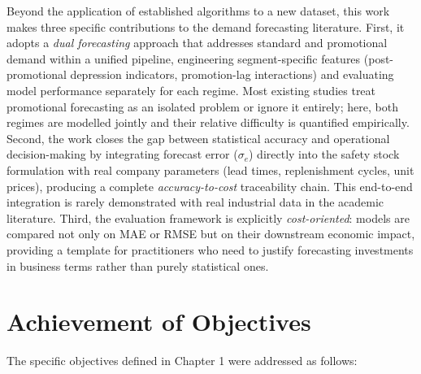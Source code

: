 Beyond the application of established algorithms to a new dataset, this work makes three specific contributions to the demand forecasting literature. First, it adopts a \textit{dual forecasting} approach that addresses standard and promotional demand within a unified pipeline, engineering segment-specific features (post-promotional depression indicators, promotion-lag interactions) and evaluating model performance separately for each regime. Most existing studies treat promotional forecasting as an isolated problem or ignore it entirely; here, both regimes are modelled jointly and their relative difficulty is quantified empirically. Second, the work closes the gap between statistical accuracy and operational decision-making by integrating forecast error ($\sigma_e$) directly into the safety stock formulation with real company parameters (lead times, replenishment cycles, unit prices), producing a complete \textit{accuracy-to-cost} traceability chain. This end-to-end integration is rarely demonstrated with real industrial data in the academic literature. Third, the evaluation framework is explicitly \textit{cost-oriented}: models are compared not only on MAE or RMSE but on their downstream economic impact, providing a template for practitioners who need to justify forecasting investments in business terms rather than purely statistical ones.

\section{Achievement of Objectives}

The specific objectives defined in Chapter 1 were addressed as follows:

